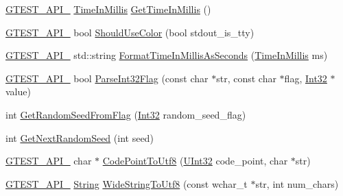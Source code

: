 \begin{DoxyCompactItemize}
\item 
\hyperlink{gtest-port_8h_aa73be6f0ba4a7456180a94904ce17790}{\-G\-T\-E\-S\-T\-\_\-\-A\-P\-I\-\_\-} \hyperlink{namespacetesting_1_1internal_a9e0fb32f592d143f031a3431366adae0}{\-Time\-In\-Millis} \hyperlink{namespacetesting_1_1internal_ae0c6fd4543c65945515c42d6f43cc138}{\-Get\-Time\-In\-Millis} ()
\item 
\hyperlink{gtest-port_8h_aa73be6f0ba4a7456180a94904ce17790}{\-G\-T\-E\-S\-T\-\_\-\-A\-P\-I\-\_\-} bool \hyperlink{namespacetesting_1_1internal_ab0f928e61ab8ec92e75ddfcae9324c1e}{\-Should\-Use\-Color} (bool stdout\-\_\-is\-\_\-tty)
\item 
\hyperlink{gtest-port_8h_aa73be6f0ba4a7456180a94904ce17790}{\-G\-T\-E\-S\-T\-\_\-\-A\-P\-I\-\_\-} std\-::string \hyperlink{namespacetesting_1_1internal_a5802d68a85d566a0c82a0df5fd2aa58b}{\-Format\-Time\-In\-Millis\-As\-Seconds} (\hyperlink{namespacetesting_1_1internal_a9e0fb32f592d143f031a3431366adae0}{\-Time\-In\-Millis} ms)
\item 
\hyperlink{gtest-port_8h_aa73be6f0ba4a7456180a94904ce17790}{\-G\-T\-E\-S\-T\-\_\-\-A\-P\-I\-\_\-} bool \hyperlink{namespacetesting_1_1internal_a082f2d6b59adc025b035b2c51b0fc47e}{\-Parse\-Int32\-Flag} (const char $\ast$str, const char $\ast$flag, \hyperlink{namespacetesting_1_1internal_a8d84339888eecdb29b3d8f7607af3ecc}{\-Int32} $\ast$value)
\item 
int \hyperlink{namespacetesting_1_1internal_a968b1b4479cfbc49079f9a06fe37d5ba}{\-Get\-Random\-Seed\-From\-Flag} (\hyperlink{namespacetesting_1_1internal_a8d84339888eecdb29b3d8f7607af3ecc}{\-Int32} random\-\_\-seed\-\_\-flag)
\item 
int \hyperlink{namespacetesting_1_1internal_ae2fa5c0c84f0feabbd41ebc1dc208c84}{\-Get\-Next\-Random\-Seed} (int seed)
\item 
\hyperlink{gtest-port_8h_aa73be6f0ba4a7456180a94904ce17790}{\-G\-T\-E\-S\-T\-\_\-\-A\-P\-I\-\_\-} char $\ast$ \hyperlink{namespacetesting_1_1internal_ae994812b6d35cea374d4f9754afc1659}{\-Code\-Point\-To\-Utf8} (\hyperlink{namespacetesting_1_1internal_a03df445d5850459574de6ffb6f57ae95}{\-U\-Int32} code\-\_\-point, char $\ast$str)
\item 
\hyperlink{gtest-port_8h_aa73be6f0ba4a7456180a94904ce17790}{\-G\-T\-E\-S\-T\-\_\-\-A\-P\-I\-\_\-} \hyperlink{classtesting_1_1internal_1_1String}{\-String} \hyperlink{namespacetesting_1_1internal_a1a297845a586bbc4f853032571736af2}{\-Wide\-String\-To\-Utf8} (const wchar\-\_\-t $\ast$str, int num\-\_\-chars)

\end{DoxyCompactItemize}
